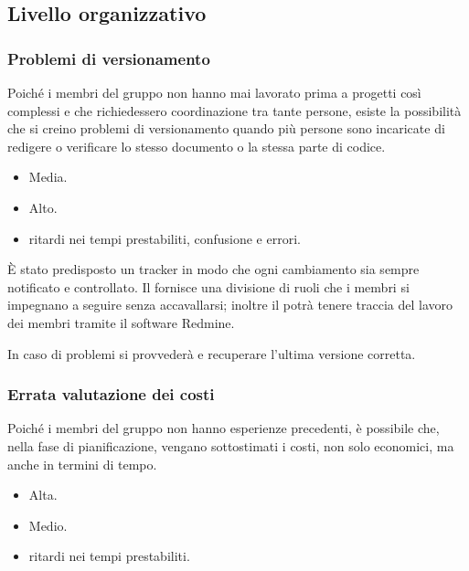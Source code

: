 \documentclass[a4paper, titlepage]{article}
\begin{document}
	
	\subsection{Livello organizzativo}
	\subsubsection{Problemi di versionamento}
	Poiché i membri del gruppo non hanno mai lavorato prima a progetti così complessi e che richiedessero coordinazione tra tante persone, esiste la possibilità che si creino problemi di versionamento quando più persone sono incaricate di redigere o verificare lo stesso documento o la stessa parte di codice.
	
	\begin{itemize}
		\item {} Media.
		\item {} Alto.
		\item {} ritardi nei tempi prestabiliti, confusione e errori.
	\end{itemize}
	
	È stato predisposto un tracker in modo che ogni cambiamento sia sempre notificato e controllato. Il  fornisce una divisione di ruoli che i membri si impegnano a seguire senza accavallarsi; inoltre il  potrà tenere traccia del lavoro dei membri tramite il software Redmine.
	
	In caso di problemi si provvederà e recuperare l'ultima versione corretta.
	
	
	\subsubsection{Errata valutazione dei costi}
	Poiché i membri del gruppo non hanno esperienze precedenti, è possibile che, nella fase di pianificazione, vengano sottostimati i costi, non solo economici, ma anche in termini di tempo.
	
	\begin{itemize}
		\item {} Alta.
		\item {} Medio.
		\item {} ritardi nei tempi prestabiliti.
	\end{itemize}
	
\end{document}
